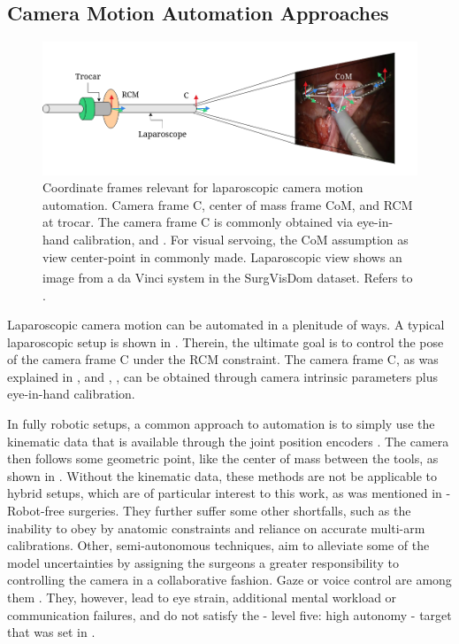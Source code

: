 \subsection{Camera Motion Automation Approaches}
\label{in:sec:automation_approaches}
\begin{figure}
    \centering
    \includegraphics[width=\textwidth]{introduction/fig/rule_based_approaches.png}
    \caption{Coordinate frames relevant for laparoscopic camera motion automation. Camera frame C, center of mass frame CoM, and RCM at trocar. The camera frame C is commonly obtained via eye-in-hand calibration,  and . For visual servoing, the CoM assumption as view center-point in commonly made. Laparoscopic view shows an image from a da Vinci\textsuperscript{\textregistered} system in the SurgVisDom\cite{zia2021surgical} dataset. Refers to .}
    \label{in:fig:com}
\end{figure}
Laparoscopic camera motion can be automated in a plenitude of ways. A typical laparoscopic setup is shown in . Therein, the ultimate goal is to control the pose of the camera frame C under the RCM constraint. The camera frame C, as was explained in 
, and , , can be obtained through camera intrinsic parameters plus eye-in-hand calibration.

In fully robotic setups, a common approach to automation is to simply use the kinematic data that is available through the joint position encoders \cite{da2020scan}. The camera then follows some geometric point, like the center of mass between the tools, as shown in . Without the kinematic data, these methods are not be applicable to hybrid setups, which are of particular interest to this work, as was mentioned in  - Robot-free surgeries. They further suffer some other shortfalls, such as the inability to obey by anatomic constraints and reliance on accurate multi-arm calibrations. Other, semi-autonomous techniques, aim to alleviate some of the model uncertainties by assigning the surgeons a greater responsibility to controlling the camera in a collaborative fashion. Gaze or voice control are among them \cite{taniguchi2010classification}. They, however, lead to eye strain, additional mental workload or communication failures, and do not satisfy the - level five: high autonomy - target that was set in .

